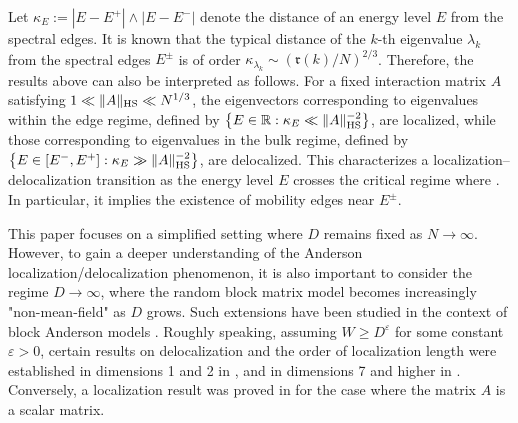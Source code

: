 \documentclass[10pt,reqno]{amsart}
\numberwithin{equation}{section}
\numberwithin{figure}{section}
\theoremstyle{plain} %
\theoremstyle{definition} %
\renewcommand{\txt}[1]{\text{\rm{#1}}}
\newcommand{\R}{\mathbb{R}}
\newcommand{\pa}[1]{\left({#1}\right)}
\newcommand{\e}{{\varepsilon}}
\newcommand{\HS}{\txt{HS}}
\numberwithin{equation}{section}
\begin{document}
Let $\kappa_E:=|E-E^+|\wedge |E-E^-|$ denote the distance of an energy level $E$ from the spectral edges. 
It is known that the typical distance of the $k$-th eigenvalue $\lambda_k$ from the spectral edges $E^\pm$ is of order $\kappa_{\lambda_k}\sim (\mathfrak{r}\pa{k}/N)^{2/3}$. Therefore, the results above can also be interpreted as follows. For a fixed interaction matrix $A$ satisfying $1\ll \|A\|_{\HS} \ll N^{1/3}$, the eigenvectors corresponding to eigenvalues within the edge regime, defined by $\left\{E\in \R:\kappa_E\ll \|A\|_{\HS}^{-2}\right\}$, are localized, while those corresponding to eigenvalues in the bulk regime, defined by $\left\{E\in[E^-,E^+]:\kappa_E\gg \|A\|_{\HS}^{-2}\right\}$, are delocalized. This characterizes a localization–delocalization transition as the energy level $E$ crosses the critical regime where \smash{$\kappa_E\sim \|A\|_{\HS}^{-2}$}. In particular, it implies the existence of mobility edges near $E^\pm$.  


This paper focuses on a simplified setting where $D$ remains fixed as $N\to \infty$. However, to gain a deeper understanding of the Anderson localization/delocalization phenomenon, it is also important to consider the regime $D\to \infty$, where the random block matrix model becomes increasingly "non-mean-field" as $D$ grows. Such extensions have been studied in the context of block Anderson models  \cite{yang2025delocalizationgeneralclassrandom,truong2025localizationlengthfinitevolumerandom,Wegner}. Roughly speaking, assuming $W\ge D^\e$ for some constant $\e>0$, certain results on delocalization and the order of localization length were established in dimensions 1 and 2 in  \cite{truong2025localizationlengthfinitevolumerandom}, and in dimensions 7 and higher in \cite{yang2025delocalizationgeneralclassrandom}. Conversely, a localization result was proved in \cite{Wegner} for the case where the matrix $A$ is a scalar matrix. 
\end{document}
